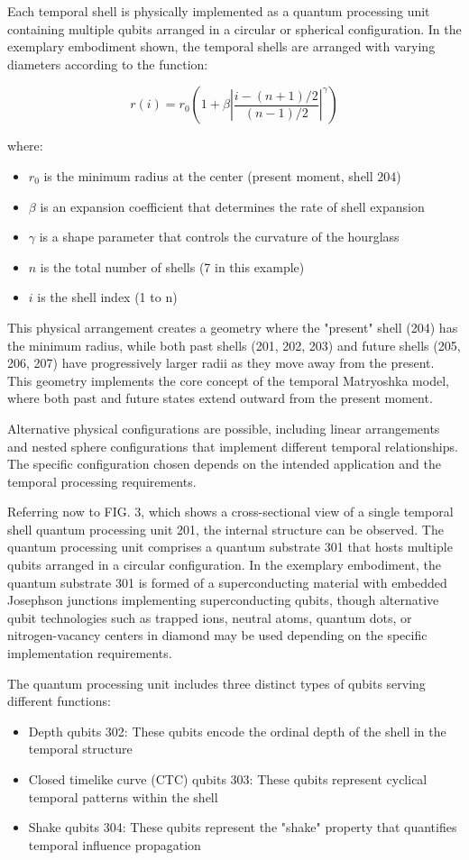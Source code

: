 \documentclass[12pt,letterpaper]{article}
\begin{document}
Each temporal shell is physically implemented as a quantum processing unit containing multiple qubits arranged in a circular or spherical configuration. In the exemplary embodiment shown, the temporal shells are arranged with varying diameters according to the function:

$$r(i) = r_0 \left(1 + \beta \left|\frac{i - (n+1)/2}{(n-1)/2}\right|^\gamma\right)$$

where:
\begin{itemize}
    \item $r_0$ is the minimum radius at the center (present moment, shell 204)
    \item $\beta$ is an expansion coefficient that determines the rate of shell expansion
    \item $\gamma$ is a shape parameter that controls the curvature of the hourglass
    \item $n$ is the total number of shells (7 in this example)
    \item $i$ is the shell index (1 to n)
\end{itemize}

This physical arrangement creates a geometry where the "present" shell (204) has the minimum radius, while both past shells (201, 202, 203) and future shells (205, 206, 207) have progressively larger radii as they move away from the present. This geometry implements the core concept of the temporal Matryoshka model, where both past and future states extend outward from the present moment.

Alternative physical configurations are possible, including linear arrangements and nested sphere configurations that implement different temporal relationships. The specific configuration chosen depends on the intended application and the temporal processing requirements.

Referring now to FIG. 3, which shows a cross-sectional view of a single temporal shell quantum processing unit 201, the internal structure can be observed. The quantum processing unit comprises a quantum substrate 301 that hosts multiple qubits arranged in a circular configuration. In the exemplary embodiment, the quantum substrate 301 is formed of a superconducting material with embedded Josephson junctions implementing superconducting qubits, though alternative qubit technologies such as trapped ions, neutral atoms, quantum dots, or nitrogen-vacancy centers in diamond may be used depending on the specific implementation requirements.

The quantum processing unit includes three distinct types of qubits serving different functions:
\begin{itemize}
    \item Depth qubits 302: These qubits encode the ordinal depth of the shell in the temporal structure
    \item Closed timelike curve (CTC) qubits 303: These qubits represent cyclical temporal patterns within the shell
    \item Shake qubits 304: These qubits represent the "shake" property that quantifies temporal influence propagation
\end{itemize}
\end{document}
